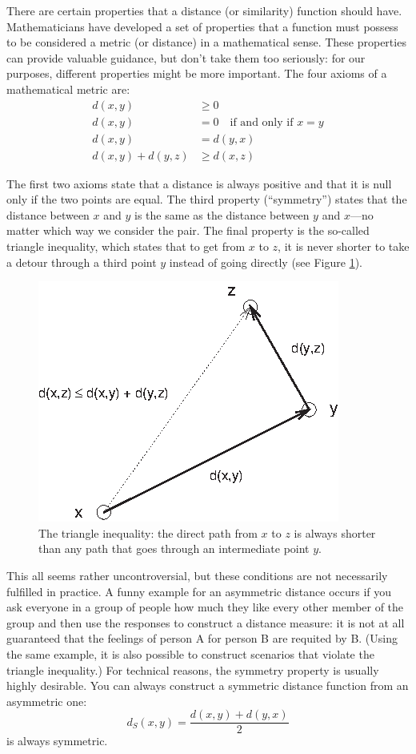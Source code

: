 There are certain properties that a distance (or similarity) function
should have. Mathematicians have developed a set of properties that a
function must possess to be considered a metric (or distance) in a
mathematical sense. These properties can provide valuable guidance,
but don't take them too seriously: for our purposes, different
properties might be more important. The four axioms of a mathematical
metric are:
\begin{align*}
d(x,y) & \ge 0 \\
d(x,y) & = 0 \quad \text{if and only if $x=y$} \\
d(x,y) & = d(y,x) \\
d(x,y) + d(y,z) & \ge d(x,z)
\end{align*}

The first two axioms state that a distance is always positive and that
it is null only if the two points are equal. The third property
(``symmetry'')  states that the distance between $x$ and $y$ is the
same as the distance between $y$ and $x$---no matter which way we
consider the pair. The final property is the so-called triangle
inequality, which states that to get from $x$ to $z$, it is never
shorter to take a detour through a third point $y$ instead of going
directly (see Figure \ref{fig:triangleeq}).

\begin{figure}
  \centerline{\includegraphics{img/triangleeq}}
  \caption{The triangle inequality: the direct path from $x$ to $z$ is
    always shorter than any path that goes through an intermediate
    point $y$.}
  \label{fig:triangleeq}
\end{figure}

This all seems rather uncontroversial, but these conditions are not
necessarily fulfilled in practice. A funny example for an asymmetric
distance occurs if you ask everyone in a group of people how much they
like every other member of the group and then use the responses to
construct a distance measure: it is not at all guaranteed that the
feelings of person A for person B are requited by B. (Using the same
example, it is also possible to construct scenarios that violate the
triangle inequality.) For technical reasons, the symmetry property is
usually highly desirable. You can always construct a symmetric
distance function from an asymmetric one:
%
\[
d_S(x,y) = \frac{ d(x,y) + d(y,x) }{2} 
\]
%
is always symmetric.

